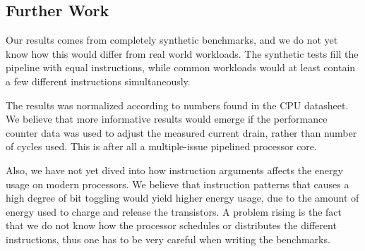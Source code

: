 %
%


\subsection{Further Work}
Our results comes from completely synthetic benchmarks, and we do not yet know
how this would differ from real world workloads. The synthetic tests fill the
pipeline with equal instructions, while common workloads would at least contain
a few different instructions simultaneously.

The results was normalized according to numbers found in the CPU
datasheet. We believe that more informative results would emerge if the
performance counter data was used to adjust the measured current drain, rather
than number of cycles used. This is after all a multiple-issue pipelined
processor core.

Also, we have not yet dived into how instruction arguments affects the energy
usage on modern processors. We believe that instruction patterns that causes a
high degree of bit toggling would yield higher energy usage, due to the amount
of energy used to charge and release the transistors. A problem rising is the
fact that we do not know how the processor schedules or distributes the
different instructions, thus one has to be very careful when writing the
benchmarks.

